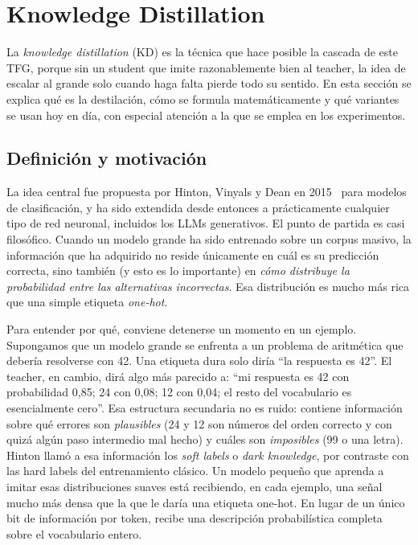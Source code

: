 \documentclass[11pt,a4paper]{article}
\begin{document}
\section{Knowledge Distillation}
\label{sec:knowledge-distillation}

La \textit{knowledge distillation} (KD) es la técnica que hace posible la cascada de este TFG, porque sin un student que imite razonablemente bien al teacher, la idea de escalar al grande solo cuando haga falta pierde todo su sentido. En esta sección se explica qué es la destilación, cómo se formula matemáticamente y qué variantes se usan hoy en día, con especial atención a la que se emplea en los experimentos.

\subsection{Definición y motivación}

La idea central fue propuesta por Hinton, Vinyals y Dean en 2015~\cite{hinton2015distilling} para modelos de clasificación, y ha sido extendida desde entonces a prácticamente cualquier tipo de red neuronal, incluidos los LLMs generativos. El punto de partida es casi filosófico. Cuando un modelo grande ha sido entrenado sobre un corpus masivo, la información que ha adquirido no reside únicamente en cuál es su predicción correcta, sino también (y esto es lo importante) en \emph{cómo distribuye la probabilidad entre las alternativas incorrectas}. Esa distribución es mucho más rica que una simple etiqueta \emph{one-hot}.

Para entender por qué, conviene detenerse un momento en un ejemplo. Supongamos que un modelo grande se enfrenta a un problema de aritmética que debería resolverse con 42. Una etiqueta dura solo diría ``la respuesta es 42''. El teacher, en cambio, dirá algo más parecido a: ``mi respuesta es 42 con probabilidad 0,85; 24 con 0,08; 12 con 0,04; el resto del vocabulario es esencialmente cero''. Esa estructura secundaria no es ruido: contiene información sobre qué errores son \emph{plausibles} (24 y 12 son números del orden correcto y con quizá algún paso intermedio mal hecho) y cuáles son \emph{imposibles} (99 o una letra). Hinton llamó a esa información los \textit{soft labels} o \textit{dark knowledge}, por contraste con las hard labels del entrenamiento clásico. Un modelo pequeño que aprenda a imitar esas distribuciones suaves está recibiendo, en cada ejemplo, una señal mucho más densa que la que le daría una etiqueta one-hot. En lugar de un único bit de información por token, recibe una descripción probabilística completa sobre el vocabulario entero.
\end{document}
